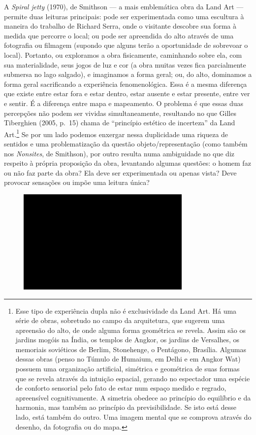 A \emph{Spiral jetty} (1970), de Smithson --- a mais emblemática obra da
Land Art --- permite duas leituras principais: pode ser experimentada
como uma escultura à maneira do trabalho de Richard Serra, onde o
visitante descobre sua forma à medida que percorre o local; ou pode ser
apreendida do alto através de uma fotografia ou filmagem (supondo que
alguns terão a oportunidade de sobrevoar o local). Portanto, ou
exploramos a obra fisicamente, caminhando sobre ela, com sua
materialidade, seus jogos de luz e cor (a obra muitas vezes fica
parcialmente submersa no lago salgado), e imaginamos a forma geral; ou,
do alto, dominamos a forma geral sacrificando a experiência
fenomenológica. Essa é a mesma diferença que existe entre estar fora e
estar dentro, estar ausente e estar presente, entre ver e sentir. É a
diferença entre mapa e mapeamento. O problema é que essas duas
percepções não podem ser vividas simultaneamente, resultando no que
Gilles Tiberghien (2005, p.~15) chama de ``princípio estético de
incerteza'' da Land Art.\footnote{Esse tipo de experiência dupla não é
  exclusividade da Land Art. Há uma série de obras, sobretudo no campo
  da arquitetura, que sugerem uma apreensão do alto, de onde alguma
  forma geométrica se revela. Assim são os jardins mogóis na Índia, os
  templos de Angkor, os jardins de Versalhes, os memoriais soviéticos de
  Berlim, Stonehenge, o Pentágono, Brasília. Algumas dessas obras (penso
  no Túmulo de Humaium, em Delhi e em Angkor Wat) possuem uma
  organização artificial, simétrica e geométrica de suas formas que se
  revela através da intuição espacial, gerando no espectador uma espécie
  de conforto sensorial pelo fato de estar num espaço medido e regrado,
  apreensível cognitivamente. A simetria obedece ao princípio do
  equilíbrio e da harmonia, mas também ao princípio da previsibilidade.
  Se isto está desse lado, está também do outro. Uma imagem mental que
  se comprova através do desenho, da fotografia ou do mapa.} Se por um
lado podemos enxergar nessa duplicidade uma riqueza de sentidos e uma
problematização da questão objeto/representação (como também nos
\emph{Nonsites}, de Smithson), por outro resulta numa ambiguidade no que
diz respeito à própria proposição da obra, levantando algumas questões:
o homem faz ou não faz parte da obra? Ela deve ser experimentada ou
apenas vista? Deve provocar sensações ou impõe uma leitura única?

\begin{figure}[!ht]
\centering
 \includegraphics[width=85mm]{./imgs/im1.jpg}
\caption{\tiny{}}
\end{figure}

